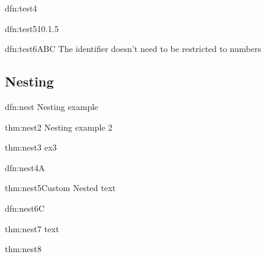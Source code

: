 \documentclass[]{article}
\begin{document}
\begin{dfn}{dfn:test4}{}
    
\end{dfn}

\begin{dfn}{dfn:test5}{10.1.5}
    
\end{dfn}

\begin{dfn}{dfn:test6}{ABC}
    The identifier doesn't need to be restricted to numbers
\end{dfn}

\newpage
\subsection{Nesting}

\begin{dfn}[Definition]{dfn:nest}{}
    Nesting example

    \begin{thm}{thm:nest2}{}
        Nesting example 2

        \begin{thm}[again]{thm:nest3}{}
            ex3
        \end{thm}
    \end{thm}
\end{dfn}

\begin{dfn}[Definition]{dfn:nest4}{A}
    \begin{thm}{thm:nest5}{Custom Nested}
        text
    \end{thm}
\end{dfn}


\begin{dfn}[Definition]{dfn:nest6}{C}
    \begin{thm}{thm:nest7}{}
        text
        \begin{thm}[nested 3]{thm:nest8}{}
            
        \end{thm}
    \end{thm}
\end{dfn}
\end{document}
